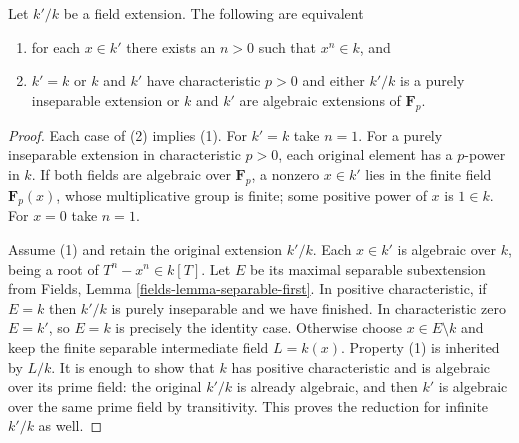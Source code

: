 \begin{lemma}
\label{editorial-source-lemma-powers-field}
\begin{reference}
\cite[Lemma 3.1.6]{Alper-adequate}
\end{reference}
Let $k'/k$ be a field extension. The following are equivalent
\begin{enumerate}
\item for each $x \in k'$ there exists an $n > 0$ such that $x^n \in k$, and
\item $k' = k$ or $k$ and $k'$ have characteristic $p > 0$ and
either $k'/k$ is a purely inseparable extension or
$k$ and $k'$ are algebraic extensions of $\mathbf{F}_p$.
\end{enumerate}
\end{lemma}

\begin{proof}
Each case of (2) implies (1). For $k'=k$
take $n=1$. For a purely inseparable
extension in characteristic $p>0$, each
original element has a $p$-power in $k$.
If both fields are algebraic over
$\mathbf F_p$, a nonzero $x\in k'$
lies in the finite field $\mathbf F_p(x)$,
whose multiplicative group is finite;
some positive power of $x$ is $1\in k$.
For $x=0$ take $n=1$.

Assume (1) and retain the original extension
$k'/k$. Each $x\in k'$ is algebraic over
$k$, being a root of $T^n-x^n\in k[T]$.
Let $E$ be its maximal separable
subextension from Fields, Lemma
\ref{fields-lemma-separable-first}.
In positive characteristic, if $E=k$
then $k'/k$ is purely inseparable and
we have finished. In characteristic
zero $E=k'$, so $E=k$ is precisely the
identity case. Otherwise choose
$x\in E\setminus k$ and keep the finite
separable intermediate field $L=k(x)$.
Property (1) is inherited by $L/k$.
It is enough to show that $k$ has
positive characteristic and is algebraic
over its prime field: the original
$k'/k$ is already algebraic, and then
$k'$ is algebraic over the same prime
field by transitivity. This proves the
reduction for infinite $k'/k$ as well.


\end{proof}
